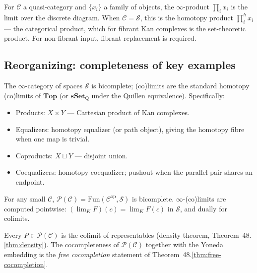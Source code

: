 \begin{remark}
For $\mathcal{C}$ a quasi-category and $\{x_i\}$ a family of objects,
the $\infty$-product $\prod_i x_i$ is the limit over the discrete
diagram. When $\mathcal{C} = \mathcal{S}$, this is the homotopy product
$\prod^h_i x_i$ — the categorical product, which for fibrant Kan
complexes is the set-theoretic product. For non-fibrant input, fibrant
replacement is required.
\end{remark}

\subsection{Reorganizing: completeness of key examples}

\begin{example_thm}
\label{ex:S-bicomplete}
The $\infty$-category of spaces $\mathcal{S}$ is bicomplete; (co)limits
are the standard homotopy (co)limits of $\mathbf{Top}$ (or $\mathbf{sSet}_{\mathrm{Q}}$
under the Quillen equivalence). Specifically:
\begin{itemize}
  \item Products: $X \times Y$ — Cartesian product of Kan complexes.
  \item Equalizers: homotopy equalizer (or path object), giving the
        homotopy fibre when one map is trivial.
  \item Coproducts: $X \sqcup Y$ — disjoint union.
  \item Coequalizers: homotopy coequalizer; pushout when the parallel
        pair shares an endpoint.
\end{itemize}
\end{example_thm}

\begin{example_thm}
\label{ex:PC-bicomplete}
For any small $\mathcal{C}$, $\mathcal{P}(\mathcal{C}) = \mathrm{Fun}(\mathcal{C}^{\mathrm{op}},
\mathcal{S})$ is bicomplete. $\infty$-(co)limits are computed pointwise:
$(\lim_K F)(c) = \lim_K F(c)$ in $\mathcal{S}$, and dually for colimits.

Every $P \in \mathcal{P}(\mathcal{C})$ is the colimit of representables
(density theorem, Theorem~48.\ref{thm:density}). The cocompleteness of
$\mathcal{P}(\mathcal{C})$ together with the Yoneda embedding is the
\emph{free cocompletion} statement of Theorem~48.\ref{thm:free-cocompletion}.
\end{example_thm}

